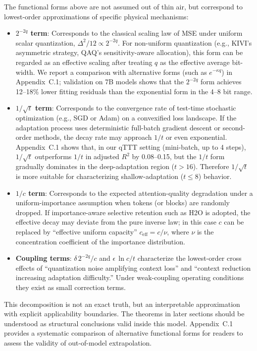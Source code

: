 \documentclass[11pt,a4paper]{article}
\theoremstyle{plain}
\theoremstyle{definition}
\begin{document}
The functional forms above are not assumed out of thin air, but correspond to lowest-order approximations of specific physical mechanisms:
\begin{itemize}
    \item \textbf{$2^{-2q}$ term}: Corresponds to the classical scaling law of MSE under uniform scalar quantization, $\Delta^2/12 \propto 2^{-2q}$. For non-uniform quantization (e.g., KIVI's asymmetric strategy, QAQ's sensitivity-aware allocation), this form can be regarded as an effective scaling after treating $q$ as the effective average bit-width. We report a comparison with alternative forms (such as $e^{-\kappa q}$) in Appendix~C.1; validation on 7B models shows that the $2^{-2q}$ form achieves 12--18\% lower fitting residuals than the exponential form in the 4--8 bit range.
    \item \textbf{$1/\sqrt{t}$ term}: Corresponds to the convergence rate of test-time stochastic optimization (e.g., SGD or Adam) on a convexified loss landscape. If the adaptation process uses deterministic full-batch gradient descent or second-order methods, the decay rate may approach $1/t$ or even exponential. Appendix~C.1 shows that, in our qTTT setting (mini-batch, up to 4 steps), $1/\sqrt{t}$ outperforms $1/t$ in adjusted $R^2$ by 0.08--0.15, but the $1/t$ form gradually dominates in the deep-adaptation region ($t > 16$). Therefore $1/\sqrt{t}$ is more suitable for characterizing shallow-adaptation ($t \leq 8$) behavior.
    \item \textbf{$1/c$ term}: Corresponds to the expected attention-quality degradation under a uniform-importance assumption when tokens (or blocks) are randomly dropped. If importance-aware selective retention such as H2O is adopted, the effective decay may deviate from the pure inverse law; in this case $c$ can be replaced by ``effective uniform capacity'' $c_{\text{eff}} = c / \nu$, where $\nu$ is the concentration coefficient of the importance distribution.
    \item \textbf{Coupling terms}: $\delta \, 2^{-2q}/c$ and $\epsilon \, \ln c / t$ characterize the lowest-order cross effects of ``quantization noise amplifying context loss'' and ``context reduction increasing adaptation difficulty.'' Under weak-coupling operating conditions they exist as small correction terms.
\end{itemize}

This decomposition is not an exact truth, but an interpretable approximation with explicit applicability boundaries. The theorems in later sections should be understood as structural conclusions valid inside this model. Appendix~C.1 provides a systematic comparison of alternative functional forms for readers to assess the validity of out-of-model extrapolation.
\end{document}
